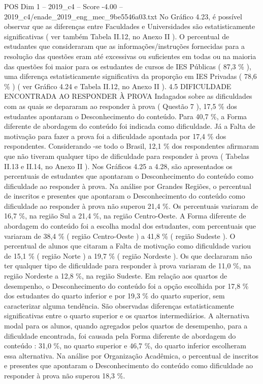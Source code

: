 \begin{textsample}{POS Dim 1 – 2019\_c4 – Score -4.00 – 2019\_c4/enade\_2019\_eng\_mec\_9be5546a03.txt}
No Gráfico 4.23, é possível observar que as diferenças entre Faculdades e Universidades são estatisticamente significativas ( ver também Tabela II.12, no Anexo II ).
O percentual de estudantes que consideraram que as informações/instruções fornecidas para a resolução das questões eram até excessivas ou suficientes em todas ou na maioria das questões foi maior para os estudantes de cursos de IES Públicas ( 87,3 \% ), uma diferença estatisticamente significativa da proporção em IES Privadas ( 78,6 \% ) ( ver Gráfico 4.24 e Tabela II.12, no Anexo II ). 4.5 DIFICULDADE ENCONTRADA AO RESPONDER À PROVA Indagados sobre as dificuldades com as quais se depararam ao responder à prova ( Questão 7 ), 17,5 \% dos estudantes apontaram o Desconhecimento do conteúdo.
Para 40,7 \%, a Forma diferente de abordagem do conteúdo foi indicada como dificuldade.
Já a Falta de motivação para fazer a prova foi a dificuldade apontada por 17,4 \% dos respondentes.
Considerando -se todo o Brasil, 12,1 \% dos respondentes afirmaram que não tiveram qualquer tipo de dificuldade para responder à prova ( Tabelas II.13 e II.14, no Anexo II ).
Nos Gráficos 4.25 a 4.28, são apresentados os percentuais de estudantes que apontaram o Desconhecimento do conteúdo como dificuldade ao responder à prova.
Na análise por Grandes Regiões, o percentual de inscritos e presentes que apontaram o Desconhecimento do conteúdo como dificuldade ao responder à prova não superou 21,4 \%.
Os percentuais variaram de 16,7 \%, na região Sul a 21,4 \%, na região Centro-Oeste.
A Forma diferente de abordagem do conteúdo foi a escolha modal dos estudantes, com percentuais que variaram de 38,4 \% ( região Centro-Oeste ) a 41,8 \% ( região Sudeste ).
O percentual de alunos que citaram a Falta de motivação como dificuldade variou de 15,1 \% ( região Norte ) a 19,7 \% ( região Nordeste ).
Os que declararam não ter qualquer tipo de dificuldade para responder à prova variaram de 11,0 \%, na região Nordeste a 12,8 \%, na região Sudeste.
Em relação aos quartos de desempenho, o Desconhecimento do conteúdo foi a opção escolhida por 17,8 \% dos estudantes do quarto inferior e por 19,3 \% do quarto superior, sem caracterizar alguma tendência.
São observadas diferenças estatisticamente significativas entre o quarto superior e os quartos intermediários.
A alternativa modal para os alunos, quando agregados pelos quartos de desempenho, para a dificuldade encontrada, foi causada pela Forma diferente de abordagem do conteúdo : 31,0 \%, no quarto superior e 46,7 \%, do quarto inferior escolheram essa alternativa.
Na análise por Organização Acadêmica, o percentual de inscritos e presentes que apontaram o Desconhecimento do conteúdo como dificuldade ao responder à prova não superou 18,3 \%.

\end{textsample}

